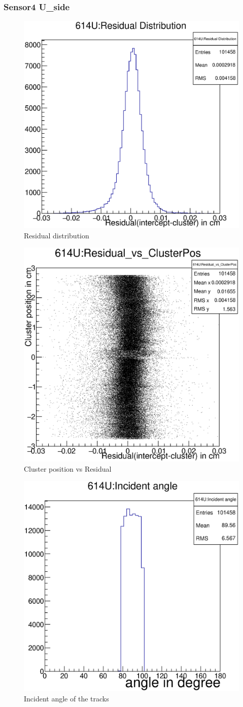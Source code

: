 \documentclass[12pt]{article}
\begin{document}
	\subsubsection{Sensor4 U\_side}
	\begin{multicols}{3}
		
		\begin{figure}[H]
			\includegraphics[width=.3\textwidth]{614U:residualplot.eps}	
			\caption{Residual distribution}	
			\label{fig1}	
		\end{figure}
		\begin{figure}[H]
			\includegraphics[width=.3\textwidth]{614U:residual_vs_clusterpos.eps}	
			\caption{Cluster position vs Residual}	
			\label{fig2}	
		\end{figure}
		\begin{figure}[H]
			\includegraphics[width=.3\textwidth]{614U:incident_angle.eps}	
			\caption{Incident angle of the tracks}	
			\label{fig2}	
		\end{figure}
	\end{multicols}
	
\end{document}
